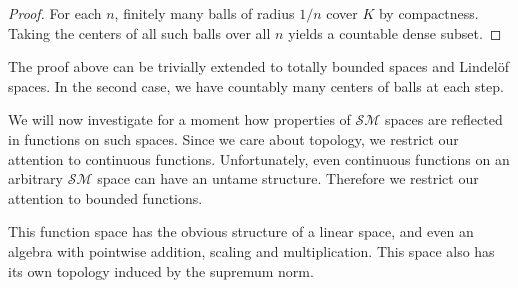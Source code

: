 
\begin{proof}
For each \( n \), finitely many balls of radius \( 1/n \) cover \( K \) by compactness. Taking the centers of all such balls over all \( n \) yields a countable dense subset.
\end{proof}

The proof above can be trivially extended to totally bounded spaces and Lindel\"of spaces. In the second case, we have countably many centers of balls at each step.


We will now investigate for a moment how properties of \( \mathcal{SM} \) spaces are reflected in functions on such spaces. Since we care about topology, we restrict our attention to continuous functions. Unfortunately, even continuous functions on an arbitrary \( \mathcal{SM} \) space can have an untame structure. Therefore we restrict our attention to bounded functions. 


This function space has the obvious structure of a linear space, and even an algebra with pointwise addition, scaling and multiplication. This space also has its own topology induced by the supremum norm.

